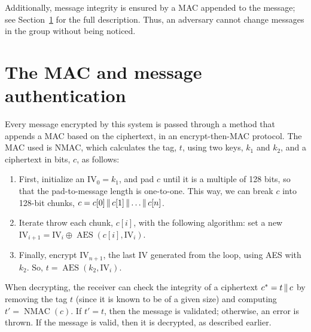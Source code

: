 \documentclass{amsart}
\DeclareMathOperator{\AES}{AES}
\begin{document}
Additionally, message integrity is ensured by a MAC appended to the message; see Section~\ref{mac} for the full description. Thus, an adversary cannot change messages in the group without being noticed.
\section{The MAC and message authentication}
\label{mac}
Every message encrypted by this system is passed through a method that appends a MAC based on the ciphertext, in an encrypt-then-MAC protocol. The MAC used is NMAC, which calculates the tag, $t$, using two keys, $k_1$ and $k_2$, and a ciphertext in bits, $c$, as follows:
\begin{enumerate}
  \item First, initialize an $\mathrm{IV}_0 = k_1$, and pad $c$ until it is a multiple of 128 bits, so that the pad-to-message length is one-to-one. This way, we can break $c$ into 128-bit chunks, $c = c[0]\operatorname{\|} c[1]\operatorname{\|} \dots \operatorname{\|} c[n]$.
  \item Iterate throw each chunk, $c[i]$, with the following algorithm: set a new $\mathrm{IV}_{i+1} = \mathrm{IV}_i \oplus \AES(c[i],\mathrm{IV}_i)$.
  \item Finally, encrypt $\mathrm{IV}_{n+1}$, the last IV generated from the loop, using AES with $k_2$. So, $t = \AES(k_2, \mathrm{IV}_i)$.
\end{enumerate}

When decrypting, the receiver can check the integrity of a ciphertext $c^* = t\operatorname{\|} c$ by removing the tag $t$ (since it is known to be of a given size) and computing $t' = \operatorname{NMAC}(c)$. If $t' = t$, then the message is validated; otherwise, an error is thrown. If the message is valid, then it is decrypted, as described earlier.
\end{document}
